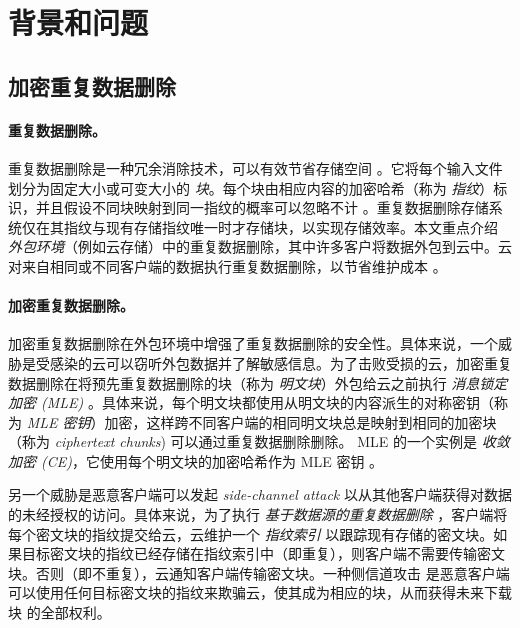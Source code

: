 \section{背景和问题}
\label{sec:featurespy-background}

\subsection{加密重复数据删除}
\label{subsec:featurespy-basics}

\paragraph*{重复数据删除。}
重复数据删除是一种冗余消除技术，可以有效节省存储空间 \cite{wallace12, meyer11}。它将每个输入文件划分为固定大小或可变大小的 {\em 块}。每个块由相应内容的加密哈希（称为 {\em 指纹}）标识，并且假设不同块映射到同一指纹的概率可以忽略不计 \cite{black06}。重复数据删除存储系统仅在其指纹与现有存储指纹唯一时才存储块，以实现存储效率。本文重点介绍 {\em 外包环境}（例如云存储）中的重复数据删除，其中许多客户将数据外包到云中。云对来自相同或不同客户端的数据执行重复数据删除，以节省维护成本 \cite{harnik10}。


\paragraph*{加密重复数据删除。}
加密重复数据删除在外包环境中增强了重复数据删除的安全性。具体来说，一个威胁是受感染的云可以窃听外包数据并了解敏感信息。为了击败受损的云，加密重复数据删除在将预先重复数据删除的块（称为 {\em 明文块}）外包给云之前执行 {\em 消息锁定加密 (MLE)} \cite{bellare13a, bellare13b}。具体来说，每个明文块都使用从明文块的内容派生的对称密钥（称为 {\em MLE 密钥}）加密，这样跨不同客户端的相同明文块总是映射到相同的加密块（称为 {\em ciphertext chunks}) 可以通过重复数据删除删除。 MLE 的一个实例是 {\em 收敛加密 (CE)}，它使用每个明文块的加密哈希作为 MLE 密钥 \cite{douceur02}。

另一个威胁是恶意客户端可以发起 {\em side-channel attack} \cite{harnik10, halevi11} 以从其他客户端获得对数据的未经授权的访问。具体来说，为了执行 {\em 基于数据源的重复数据删除} \cite{harnik10}，客户端将每个密文块的指纹提交给云，云维护一个 {\em 指纹索引} 以跟踪现有存储的密文块。如果目标密文块的指纹已经存储在指纹索引中（即重复），则客户端不需要传输密文块。否则（即不重复），云通知客户端传输密文块。一种侧信道攻击 \cite{mulazzani11, halevi11} 是恶意客户端可以使用任何目标密文块的指纹来欺骗云，使其成为相应的块，从而获得未来下载块 \cite{mulazzani11} 的全部权利。


